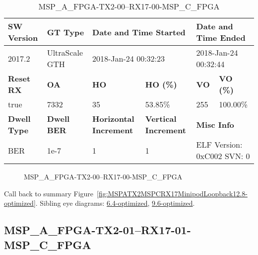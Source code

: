 \begin{table}[h]
\centering
\caption{MSP\_A\_FPGA-TX2-00--RX17-00-MSP\_C\_FPGA}
\label{tab:MSPAFPGATX200RX1700MSPCFPGA12.8-optimized}
\begin{tabular}{@{}|l|l|l|l|l|l|@{}}
\toprule
\textbf{SW Version}                & \textbf{GT Type}   & \multicolumn{2}{l|}{\textbf{Date and Time Started}}            & \multicolumn{2}{l|}{\textbf{Date and Time Ended}}        \\ \midrule
2017.2                       & UltraScale GTH          & \multicolumn{2}{l|}{2018-Jan-24 00:32:23}                   & \multicolumn{2}{l|}{2018-Jan-24 00:32:44}               \\ \midrule
\textbf{Reset RX}                  & \textbf{OA} & \textbf{HO}   & \textbf{HO (\%)} & \textbf{VO} & \textbf{VO (\%)} \\ \midrule
true & 7332        & 35          & 53.85\%        & 255        & 100.00\%       \\ \midrule
\textbf{Dwell Type}                & \textbf{Dwell BER} & \textbf{Horizontal Increment} & \textbf{Vertical Increment}    & \multicolumn{2}{l|}{\textbf{Misc Info}}                  \\ \midrule
BER                            & 1e-7        & 1        & 1           & \multicolumn{2}{l|}{ELF Version: 0xC002 SVN: 0}                         \\ \bottomrule
\end{tabular}
\end{table}

\begin{figure}[h]
\caption{MSP\_A\_FPGA-TX2-00--RX17-00-MSP\_C\_FPGA} \label{fig:MSPAFPGATX200RX1700MSPCFPGA12.8-optimized}
\end{figure}

Call back to summary Figure~\ref{fig:MSPATX2MSPCRX17MinipodLoopback12.8-optimized}.
Sibling eye diagrams: \hyperref[sec:MSPAFPGATX200RX1700MSPCFPGA6.4-optimized]{6.4-optimized}, \hyperref[sec:MSPAFPGATX200RX1700MSPCFPGA9.6-optimized]{9.6-optimized}.

\clearpage
\newpage


\subsection{MSP\_A\_FPGA-TX2-01--RX17-01-MSP\_C\_FPGA}\label{sec:MSPAFPGATX201RX1701MSPCFPGA12.8-optimized}


